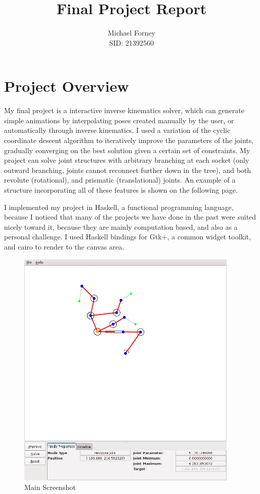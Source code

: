 \documentclass{article}
\title{Final Project Report}
\author{Michael Forney \\ SID: 21392560}
\begin{document}
    \maketitle
    \doublespacing

    \section{Project Overview}
    My final project is a interactive inverse kinematics solver, which can
    generate simple animations by interpolating poses created manually by the
    user, or automatically through inverse kinematics. I used a variation of the
    cyclic coordinate descent algorithm to iteratively improve the parameters of
    the joints, gradually converging on the best solution given a certain set of
    constraints. My project can solve joint structures with arbitrary branching
    at each socket (only outward branching, joints cannot reconnect further down
    in the tree), and both revolute (rotational), and prismatic (translational)
    joints. An example of a structure incorporating all of these features is
    shown on the following page.

    I implemented my project in Haskell, a functional programming language,
    because I noticed that many of the projects we have done in the past were
    suited nicely toward it, because they are mainly computation based, and also
    as a personal challenge. I used Haskell bindings for Gtk+, a common widget
    toolkit, and cairo to render to the canvas area.

    \begin{figure}[H]
        \caption{Main Screenshot}
        \centering
        \includegraphics[width=400px]{main_screenshot.png}
    \end{figure}
\end{document}
